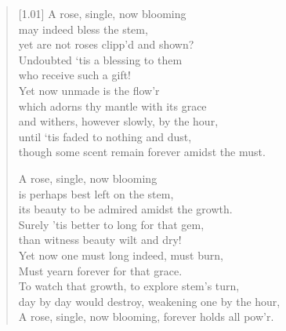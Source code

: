 \begin{verse}[1.01\textwidth]
  A rose, single, now blooming\\
  \vin may indeed bless the stem,\\
  yet are not roses clipp’d and shown?\\
  \vin Undoubted ‘tis a blessing to them\\
  who receive such a gift!\\
  \vin Yet now unmade is the flow’r\\
  which adorns thy mantle with its grace\\
  \vin and withers, however slowly, by the hour,\\
  \vin \vin until ‘tis faded to nothing and dust,\\
  \vin \vin though some scent remain forever amidst the must.

  A rose, single, now blooming\\
  \vin is perhaps best left on the stem,\\
  its beauty to be admired amidst the growth.\\
  \vin Surely 'tis better to long for that gem,\\
  than witness beauty wilt and dry!\\
  \vin Yet now one must long indeed, must burn,\\
  Must yearn forever for that grace.\\
  \vin To watch that growth, to explore stem's turn,\\
  \vin \vin day by day would destroy, weakening one by the hour,\\
  \vin \vin A rose, single, now blooming, forever holds all pow'r.
\end{verse}
